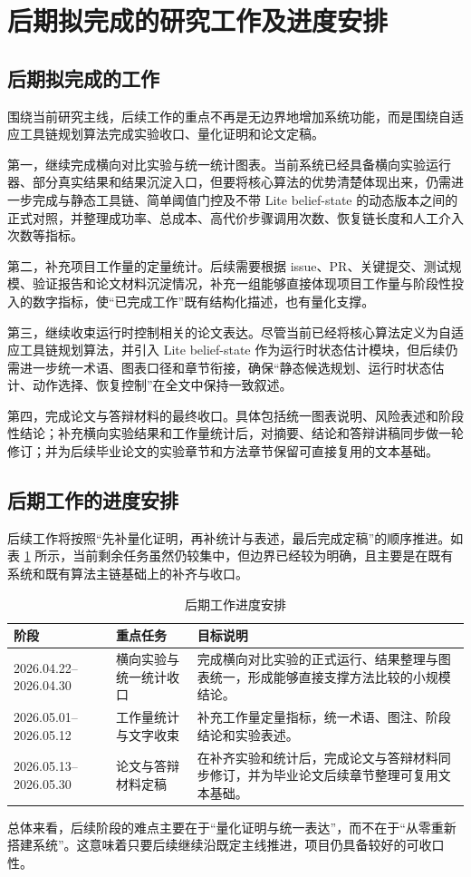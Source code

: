 \section{后期拟完成的研究工作及进度安排}

\subsection{后期拟完成的工作}

围绕当前研究主线，后续工作的重点不再是无边界地增加系统功能，而是围绕自适应工具链规划算法完成实验收口、量化证明和论文定稿。

第一，继续完成横向对比实验与统一统计图表。当前系统已经具备横向实验运行器、部分真实结果和结果沉淀入口，但要将核心算法的优势清楚体现出来，仍需进一步完成与静态工具链、简单阈值门控及不带 Lite belief-state 的动态版本之间的正式对照，并整理成功率、总成本、高代价步骤调用次数、恢复链长度和人工介入次数等指标。

第二，补充项目工作量的定量统计。后续需要根据 issue、PR、关键提交、测试规模、验证报告和论文材料沉淀情况，补充一组能够直接体现项目工作量与阶段性投入的数字指标，使“已完成工作”既有结构化描述，也有量化支撑。

第三，继续收束运行时控制相关的论文表达。尽管当前已经将核心算法定义为自适应工具链规划算法，并引入 Lite belief-state 作为运行时状态估计模块，但后续仍需进一步统一术语、图表口径和章节衔接，确保“静态候选规划、运行时状态估计、动作选择、恢复控制”在全文中保持一致叙述。

第四，完成论文与答辩材料的最终收口。具体包括统一图表说明、风险表述和阶段性结论；补充横向实验结果和工作量统计后，对摘要、结论和答辩讲稿同步做一轮修订；并为后续毕业论文的实验章节和方法章节保留可直接复用的文本基础。

\subsection{后期工作的进度安排}

后续工作将按照“先补量化证明，再补统计与表述，最后完成定稿”的顺序推进。如表 \ref{tab:midterm-next-steps} 所示，当前剩余任务虽然仍较集中，但边界已经较为明确，且主要是在既有系统和既有算法主链基础上的补齐与收口。

\begin{table}[htbp]
	\centering
	\caption{后期工作进度安排}
	\label{tab:midterm-next-steps}
	\renewcommand{\arraystretch}{1.22}
	\begin{tabularx}{\textwidth}{p{2.7cm}p{4.0cm}>{\raggedright\arraybackslash}X}
		\toprule
		阶段 & 重点任务 & 目标说明 \\
		\midrule
		2026.04.22--2026.04.30 & 横向实验与统一统计收口 & 完成横向对比实验的正式运行、结果整理与图表统一，形成能够直接支撑方法比较的小规模结论。 \\
		2026.05.01--2026.05.12 & 工作量统计与文字收束 & 补充工作量定量指标，统一术语、图注、阶段结论和实验表述。 \\
		2026.05.13--2026.05.30 & 论文与答辩材料定稿 & 在补齐实验和统计后，完成论文与答辩材料同步修订，并为毕业论文后续章节整理可复用文本基础。 \\
		\bottomrule
	\end{tabularx}
\end{table}

总体来看，后续阶段的难点主要在于“量化证明与统一表达”，而不在于“从零重新搭建系统”。这意味着只要后续继续沿既定主线推进，项目仍具备较好的可收口性。
